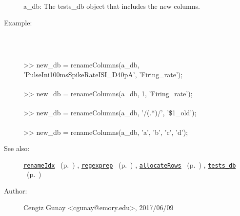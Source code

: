 \begin{description}
   a\_db: The tests\_db object that includes the new columns.
%
\item[Example:]~
\begin{lyxcode} %
\\%
 >> new\_db = renameColumns(a\_db, 'PulseIni100msSpikeRateISI\_D40pA', 'Firing\_rate');
\\%
\\%
 >> new\_db = renameColumns(a\_db, 1, 'Firing\_rate');
\\%
\\%
 >> new\_db = renameColumns(a\_db, '/(.*)/', '\$1\_old');
\\%
\\%
 >> new\_db = renameColumns(a\_db, {'a', 'b'}, {'c', 'd'});
\\%
\end{lyxcode}
%
\item[See also:]%
\hyperlink{ref_renameIdx}{\texttt{renameIdx}}%
\ (p.~\pageref{ref_renameIdx})%
%
, \hyperlink{ref_regexprep}{\texttt{regexprep}}%
\ (p.~\pageref{ref_regexprep})%
%
, \hyperlink{ref_allocateRows}{\texttt{allocateRows}}%
\ (p.~\pageref{ref_allocateRows})%
%
, \hyperlink{ref_tests_db}{\texttt{tests\_db}}%
\ (p.~\pageref{ref_tests_db})%
%
%
\item[Author:]%
Cengiz Gunay <cgunay@emory.edu>, 2017/06/09
%
\end{description}
\methodline%
